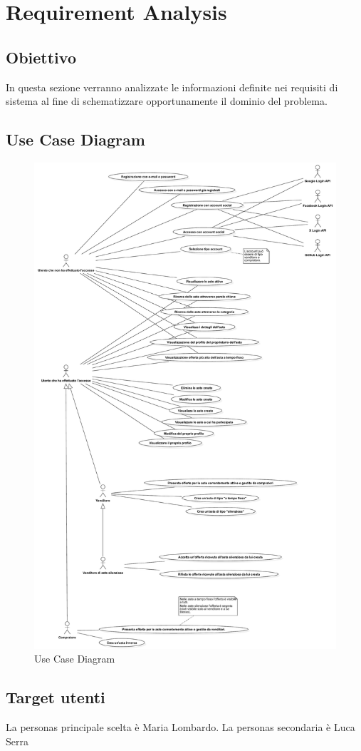 
\chapter{Requirement Analysis}
    \section{Obiettivo}
        In questa sezione verranno analizzate le informazioni definite nei requisiti di sistema al fine di schematizzare opportunamente il dominio del problema.

    \section{Use Case Diagram}
        \begin{figure}[htbp!]
            \centering
                \vspace{2\baselineskip}
                \includegraphics[width=0.51\linewidth]{Immagini/Diagrammi/UseCaseDiagram.pdf}
            \caption{Use Case Diagram}
            \label{fig:Use Case Diagram}
        \end{figure}

    \newpage
    
    \section{Target utenti}
        La personas principale scelta è Maria Lombardo. La personas secondaria è Luca Serra
        
